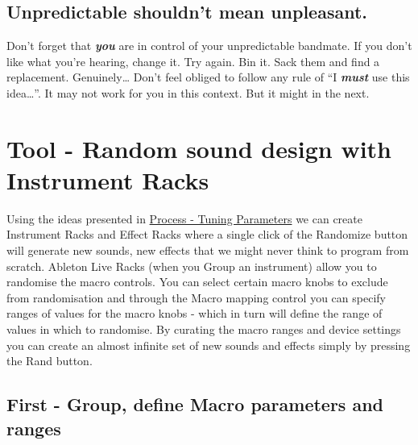 \documentclass[
  12pt,
  letterpaper,
  oneside,
  open=any]{scrbook}
\begin{document}
\section{Unpredictable shouldn't mean
unpleasant.}\label{unpredictable-shouldnt-mean-unpleasant.}

Don't forget that \textbf{\emph{you}} are in control of your
unpredictable bandmate. If you don't like what you're hearing, change
it. Try again. Bin it. Sack them and find a replacement.
Genuinely\ldots{} Don't feel obliged to follow any rule of ``I
\textbf{\emph{must}} use this idea\ldots{}''. It may not work for you in
this context. But it might in the next.


\chapter{Tool - Random sound design with Instrument
Racks}\label{Chapter-024-Tool-Random_Sound_Design}

\begin{tcolorbox}[enhanced jigsaw, titlerule=0mm, toprule=.15mm, bottomrule=.15mm, colframe=quarto-callout-tip-color-frame, bottomtitle=1mm, opacityback=0, breakable, leftrule=.75mm, coltitle=black, colback=white, rightrule=.15mm, arc=.35mm, toptitle=1mm, title=\textcolor{quarto-callout-tip-color}{\faLightbulb}\hspace{0.5em}{Key idea}, opacitybacktitle=0.6, left=2mm, colbacktitle=quarto-callout-tip-color!10!white]

Using the ideas presented in
\hyperref[Chapter-008-Process-Tuning_Parameters]{Process - Tuning
Parameters} we can create Instrument Racks and Effect Racks where a
single click of the Randomize button will generate new sounds, new
effects that we might never think to program from scratch. Ableton Live
Racks (when you Group an instrument) allow you to randomise the macro
controls. You can select certain macro knobs to exclude from
randomisation and through the Macro mapping control you can specify
ranges of values for the macro knobs - which in turn will define the
range of values in which to randomise. By curating the macro ranges and
device settings you can create an almost infinite set of new sounds and
effects simply by pressing the Rand button.

\end{tcolorbox}

\section{First - Group, define Macro parameters and
ranges}\label{first---group-define-macro-parameters-and-ranges}
\end{document}
